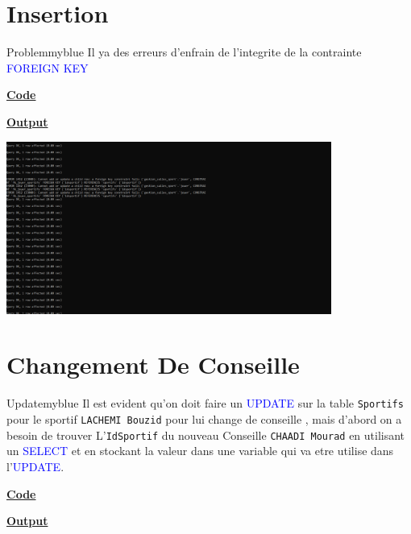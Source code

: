 \newpage
{}
\section{Insertion}
\begin{prettyBox}{Problem}{myblue}
Il ya des erreurs d'enfrain de l'integrite de la contrainte 
\textcolor{blue}{FOREIGN KEY}
\end{prettyBox}

\vspace{0.25cm}
\textbf{\underline{Code}}



\vspace{0.25cm}
\textbf{\underline{Output}}

\vspace{0.25cm}
\begin{center}
    \includegraphics[width=0.8\textwidth]{Parties/Partie2/insert.PNG}
\end{center}

\newpage
\section{Changement De Conseille}
\begin{prettyBox}{Update}{myblue}
    Il est evident qu'on doit faire un \textcolor{blue}{UPDATE} sur la table \texttt{Sportifs} pour 
le sportif \texttt{LACHEMI Bouzid} pour lui change de conseille , mais d'abord
on a besoin de trouver L'\texttt{IdSportif} du nouveau Conseille \texttt{CHAADI Mourad} en 
utilisant un \textcolor{blue}{SELECT} et en stockant la valeur dans une variable qui 
va etre utilise dans l'\textcolor{blue}{UPDATE}.
\end{prettyBox}
\vspace{0.25cm}

\textbf{\underline{Code}}


\vspace{0.25cm}
\textbf{\underline{Output}}

